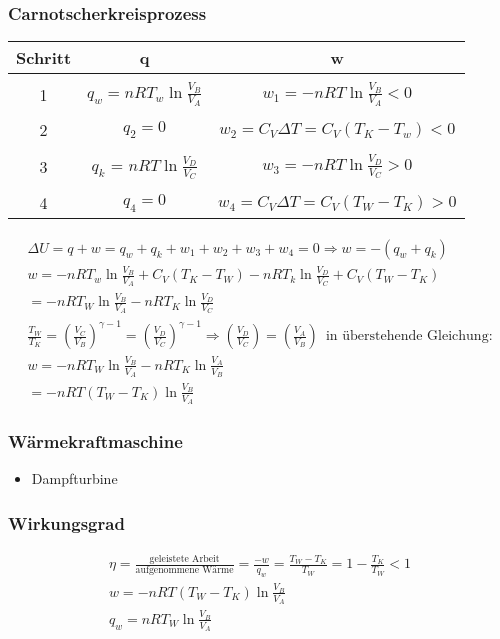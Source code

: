 \documentclass[a4paper, fleqn]{article}
\begin{document}
\subsubsection{Carnotscherkreisprozess}
\begin{center}
    \begin{tabular}{c c c}
        \hline
        Schritt & q & w\\
        \hline
        \\
        1 & $q_w=nRT_w\ln\frac{V_B}{V_A}$ & $w_1 = -nRT\ln\frac{V_B}{V_A} < 0$\\
        \\
        2 & $q_2=0$ & $w_2=C_V\Delta T = C_V(T_K-T_w) < 0$\\
        \\
        3 & $q_k$ = $nRT\ln\frac{V_D}{V_C}$ & $w_3 = -nRT \ln\frac{V_D}{V_C} > 0$\\
        \\
        4 & $q_4 = 0$ & $w_4 = C_V\Delta T = C_V(T_W-T_K) > 0$\\
        \hline
    \end{tabular}
\end{center}
\begin{eqnarray*}
    \Delta U = q+w=q_w+q_k+w_1+w_2+w_3+w_4 = 0 \Rightarrow w=-(q_w+q_k)\\
    w=-nRT_w\ln\frac{V_B}{V_A}+C_V(T_K-T_W)-nRT_k\ln\frac{V_D}{V_C}+C_V(T_W-T_K)\\
    =-nRT_W\ln\frac{V_B}{V_A}-nRT_K\ln\frac{V_D}{V_C}\\
    \frac{T_W}{T_K}=\left(\frac{V_C}{V_B}\right)^{\gamma-1}=\left(\frac{V_D}{V_C}\right)^{\gamma-1} \Rightarrow \left(\frac{V_D}{V_C}\right)=\left(\frac{V_A}{V_B}\right)\,\text{ in überstehende Gleichung:}\\
    w = -nRT_W\ln\frac{V_B}{V_A}-nRT_K\ln\frac{V_A}{V_B}\\
    = -nRT(T_W-T_K)\ln\frac{V_B}{V_A}
\end{eqnarray*}

\subsubsection{Wärmekraftmaschine}
\begin{itemize}
    \item Dampfturbine
\end{itemize}

\subsubsection{Wirkungsgrad}
\begin{eqnarray*}
    \eta = \frac{\text{geleistete Arbeit}}{\text{aufgenommene Wärme}}=\frac{-w}{q_w}=\frac{T_W-T_K}{T_W}=1-\frac{T_K}{T_W} < 1\\
    w=-nRT(T_W-T_K)\ln\frac{V_B}{V_A}\\
    q_w = nRT_W\ln\frac{V_B}{V_A}
\end{eqnarray*}
\end{document}
